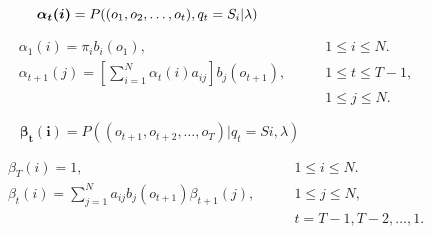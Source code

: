 \begin{equation}
\boldsymbol{\alpha_t(i)} = P((o_1, o_2, \dots, o_t), q_t = S_i | \lambda)
\hspace{9.8em}\label{eq:fw:forw}
\end{equation}

\begin{align}
\alpha_1(i) = \pi_i b_i(o_1),\qquad &1 \leq i \leq N.
\label{eq:fw:forw:init} \\
\alpha_{t+1}(j) = [\sum_{i=1}^N \alpha_t(i) a_{ij}] b_j(o_{t+1}),
\qquad &1 \leq t \leq T - 1, \nonumber \\
&1 \leq j \leq N.\label{eq:fw:forw:loop}
\end{align}

\begin{equation}
\boldsymbol{\beta_t(i)} = P((o_{t+1}, o_{t+2}, \dots, o_T) | q_t = Si, \lambda)
\hspace{8em}\label{eq:fw:back}
\end{equation}

\begin{align}
\beta_T(i) = 1,\qquad &1 \leq i \leq N.
\label{eq:fw:back:init} \\
\beta_{t}(i) = \sum_{j=1}^N a_{ij} b_j(o_{t+1}) \beta_{t+1}(j),\qquad
&1 \leq j \leq N, \nonumber \\
&t = T-1, T-2, \dots, 1.
\label{eq:fw:back:loop}
\end{align}

